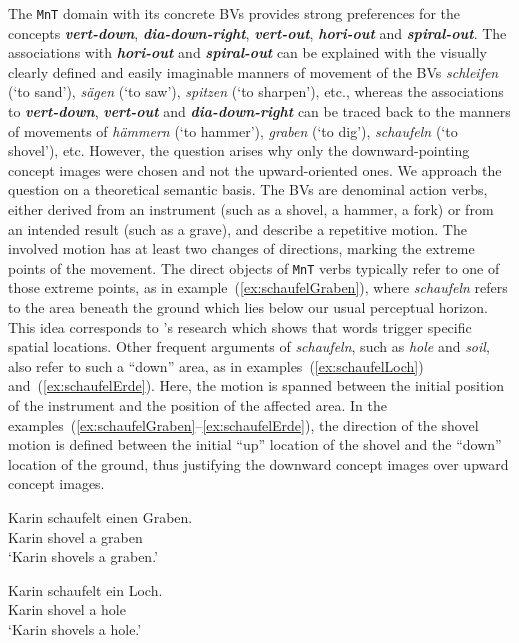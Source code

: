 \documentclass[output=paper]{langsci/langscibook}
\newcommand{\textci}[1]{\textit{\textbf{#1}}}
\begin{document}
The \texttt{MnT} domain with its concrete BVs provides strong
preferences for the concepts \textci{vert-down},
\textci{dia-down-right}, \textci{vert-out}, \textci{hori-out} and
\textci{spiral-out}. The associations with \textci{hori-out} and
\textci{spiral-out} can be explained with the visually clearly defined
and easily imaginable manners of movement of the BVs
\textit{schleifen} (`to sand'), \textit{sägen} (`to saw'),
\textit{spitzen} (`to sharpen'), etc., whereas the associations to
\textci{vert-down}, \textci{vert-out} and \textci{dia-down-right} can
be traced back to the manners of movements of \textit{hämmern} (`to
hammer'), \textit{graben} (`to dig'), \textit{schaufeln} (`to
shovel'), etc. However, the question arises why only the
downward-pointing concept images were chosen and not the upward-oriented ones. We
approach the question on a theoretical semantic basis. The BVs are
denominal action verbs, either derived from an instrument (such as a
shovel, a hammer, a fork) or from an intended result (such as a
grave), and describe a repetitive motion. The involved motion has at
least two changes of directions, marking the extreme points of the
movement. The direct objects of \texttt{MnT} verbs typically refer to
one of those extreme points, as in example~(\ref{ex:schaufelGraben}),
where \textit{schaufeln} refers to the area beneath the ground which
lies below our usual perceptual horizon. This idea corresponds to
\cite{LachmairEtAl:16}'s research which shows that words trigger
specific spatial locations. Other frequent arguments of
\textit{schaufeln}, such as \textit{hole} and \textit{soil}, also
refer to such a ``down'' area, as in examples~(\ref{ex:schaufelLoch})
and~(\ref{ex:schaufelErde}). Here, the motion is spanned between the
initial position of the instrument and the position of the affected
area. In the
examples~(\ref{ex:schaufelGraben}--\ref{ex:schaufelErde}), the
direction of the shovel motion is defined between the initial ``up''
location of the shovel and the ``down'' location of the ground, thus
justifying the downward concept images over upward concept images.

\ea\label{ex:schaufelGraben} 
\gll Karin schaufelt einen Graben.\\ 
Karin shovel a graben\\
\glt `Karin shovels a graben.'
\z 

\ea\label{ex:schaufelLoch} 
\gll Karin schaufelt ein Loch.\\ 
Karin shovel a hole\\
\glt `Karin shovels a hole.'
\z  
\end{document}
